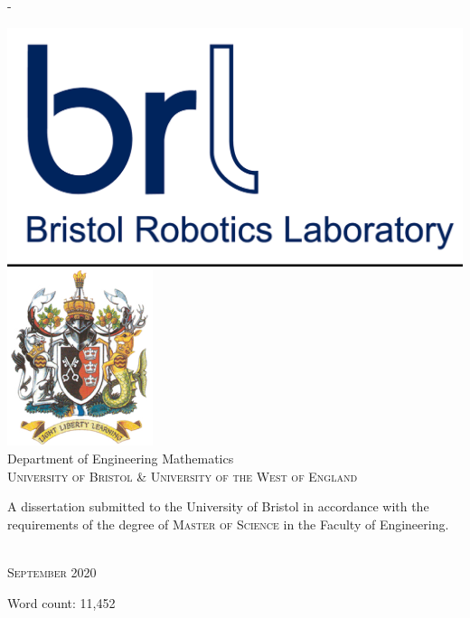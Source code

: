 \begin{titlingpage}
\begin{SingleSpace}
\begin{adjustwidth*}{\unitlength}{-\unitlength}
\begin{center}
\hspace{20mm}
\includegraphics[scale=0.1]{logos/BRL-SNI.png}
\hspace{20mm}
\includegraphics[scale=0.5]{logos/uweCrest.png}\\
\vspace{6mm}
{\large Department of Engineering Mathematics\\
\textsc{University of Bristol \& University of the West of England}}\\
\vspace{11mm}
\begin{minipage}{10cm}
A dissertation submitted to the University of Bristol in accordance with the requirements of the degree of \textsc{Master of Science} in the Faculty of Engineering.
\end{minipage}\\
\vspace{9mm}
{\large\textsc{September 2020}}
\vspace{12mm}
\end{center}
\begin{flushright}
{\small Word count: 11,452}
\end{flushright}
\end{adjustwidth*}
\end{SingleSpace}
\end{titlingpage}
